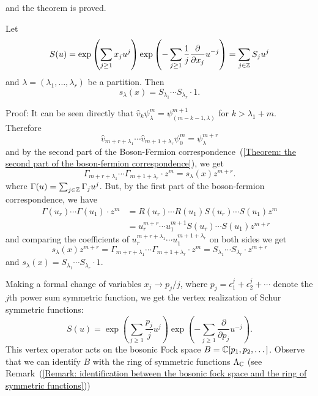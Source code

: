 and the theorem is proved.
\begin{dang}
    \begin{corollary}\label{Corollary: vertex operator realization of Schur symmetric functions}
        Let 
        \begin{equation}
            S(u)= \exp\left(\sum_{j\geq1}x_ju^j\right)\exp\left(-\sum_{j\geq1}\frac{1}{j}\frac{\partial}{\partial x_j}u^{-j}\right)=\sum_{j\in \mathbb{Z}}S_ju^j
        \end{equation}
        and $\lambda=(\lambda_1,\dots,\lambda_r)$ be a partition. Then
        \begin{equation}
            s_\lambda(x)=S_{\lambda_1}\cdots S_{\lambda_r}\cdot 1.
        \end{equation}
    \end{corollary}
\end{dang}
Proof: It can be seen directly that $\hat{v}_k\psi_\lambda^m=\psi_{(m-k-1,\lambda)}^{m+1}$ for $k>\lambda_1+m$.  Therefore
\begin{equation}
    \hat{v}_{m+r+\lambda_1}\cdots \hat{v}_{m+1+\lambda_r}\psi_0^m=\psi_\lambda^{m+r}
\end{equation}
and by the second part of the Boson-Fermion correspondence~(\ref{Theorem: the second part of the boson-fermion correspondence}), we get
\begin{equation}
    \Gamma_{m+r+\lambda_1}\cdots \Gamma_{m+1+\lambda_r}\cdot z^m=s_\lambda(x)z^{m+r}.
\end{equation}
where $\Gamma(u)=\sum_{j\in\mathbb{Z}}\Gamma_ju^j$. But, by the first part of the boson-fermion correspondence, we have
\begin{equation}
\begin{split}
    \Gamma(u_r)\cdots \Gamma(u_1)\cdot z^m&=R(u_r)\cdots R(u_1)S(u_r)\cdots S(u_1)z^{m}\\
    &=u_r^{m+r}\cdots u_1^{m+1}S(u_r)\cdots S(u_1)z^{m+r}
\end{split}
\end{equation}
and comparing the coefficients of $u_{r}^{m+r+\lambda_1}\cdots u_1^{m+1+\lambda_r}$ on both sides we get 
\begin{equation}
    s_\lambda(x)z^{m+r}=\Gamma_{m+r+\lambda_1}\cdots\Gamma_{m+1+\lambda_r}\cdot z^m= S_{\lambda_1}\cdots S_{\lambda_r}\cdot z^{m+r}
\end{equation}
and $s_\lambda(x) =S_{\lambda_1}\cdots S_{\lambda_r}\cdot 1$.\par

Making a formal change of variables $x_j\rightarrow p_j/j$, where $p_j=\epsilon_1^j+\epsilon_2^j+\cdots$ denote the $j$th
power sum symmetric function, we get  the vertex realization of Schur symmetric functions:
\begin{equation}\label{Equation: vertex realization of Shcur symmetric functions}
    S(u) = \exp\left(\sum_{j\geq1}\frac{p_j}j{}u^j\right)\exp\left(-\sum_{j\geq1}\frac{\partial}{\partial p_j}u^{-j}\right).
\end{equation}
This vertex operator acts on the bosonic Fock space $B=\mathbb{C}[p_1,p_2,\dots]$. Observe that we can identify $B$ with the ring of symmetric functions $\Lambda_{\mathbb{C}}$ (see Remark~(\ref{Remark: identification between the bosonic fock space and the ring of symmetric functions}))

